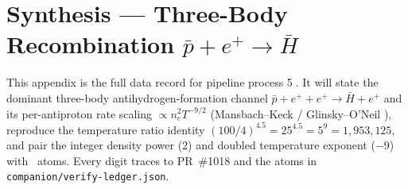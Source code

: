 \section{Synthesis --- Three-Body Recombination $\bar p + e^+ \to \bar H$}
\label{app:synthesis}

This appendix is the full data record for pipeline process
\textcircled{\scriptsize 5}. It will state the dominant three-body
antihydrogen-formation channel $\bar p + e^+ + e^+ \to \bar H + e^+$
\citep{gabrielse2002driven} and its per-antiproton rate scaling
$\propto n_e^2 T^{-9/2}$ (Mansbach--Keck / Glinsky--O'Neil
\citep{glinsky1991oneil}), reproduce the temperature ratio identity
$(100/4)^{4.5}=25^{4.5}=5^9=1{,}953{,}125$, and pair the integer density
power ($2$) and doubled temperature exponent ($-9$) with \tierBlue\ atoms.
Every digit traces to PR~\#1018 and the atoms in
\texttt{companion/verify-ledger.json}.

